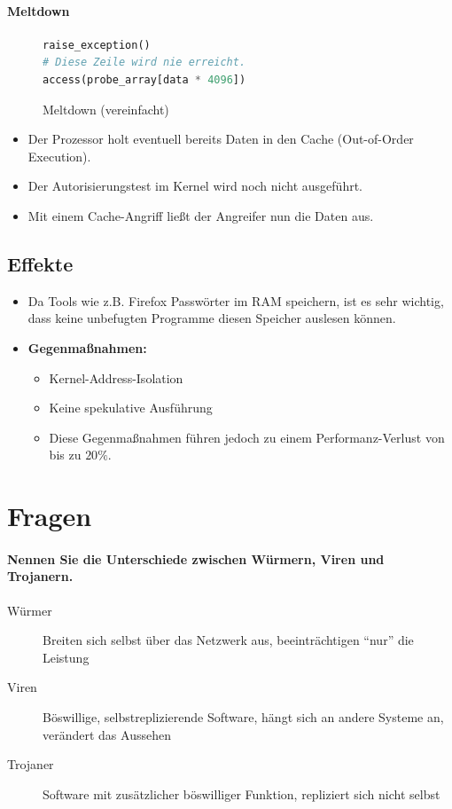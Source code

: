 \documentclass[a4paper, 11pt, accentcolor = tud3b]{tudreport}
\begin{document}
	        \paragraph{Meltdown}
		        \begin{figure}[H]
		        	\centering
		        	\begin{lstlisting}[language = Python]
raise_exception()
# Diese Zeile wird nie erreicht.
access(probe_array[data * 4096])
\end{lstlisting}
		        	\caption{Meltdown (vereinfacht)}
		        \end{figure}
		        \begin{itemize}
		        	\item Der Prozessor holt eventuell bereits Daten in den Cache (Out-of-Order Execution).
		        	\item Der Autorisierungstest im Kernel wird noch nicht ausgeführt.
		        	\item Mit einem Cache-Angriff ließt der Angreifer nun die Daten aus.
		        \end{itemize}

            \subsection{Effekte}
                \begin{itemize}
                	\item Da Tools wie z.B. Firefox Passwörter im RAM speichern, ist es sehr wichtig, dass keine unbefugten Programme diesen Speicher auslesen können.
                	\item \textbf{Gegenmaßnahmen:}
	                	\begin{itemize}
	                		\item Kernel-Address-Isolation
	                		\item Keine spekulative Ausführung
	                		\item Diese Gegenmaßnahmen führen jedoch zu einem Performanz-Verlust von bis zu \(20\%\).
	                	\end{itemize}
                \end{itemize}

        \section{Fragen} %
			\paragraph{Nennen Sie die Unterschiede zwischen Würmern, Viren und Trojanern.}
			\begin{description}
				\item[Würmer] Breiten sich selbst über das Netzwerk aus, beeinträchtigen \enquote{nur} die Leistung
				\item[Viren] Böswillige, selbstreplizierende Software, hängt sich an andere Systeme an, verändert das Aussehen
				\item[Trojaner] Software mit zusätzlicher böswilliger Funktion, repliziert sich nicht selbst
			\end{description}
			
\end{document}
